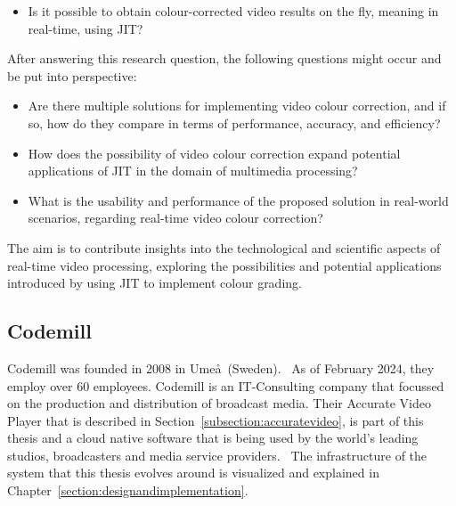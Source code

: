\documentclass[../MasterThesis.tex]{subfiles}
\begin{document}
	\begin{itemize}
		\item Is it possible to obtain colour-corrected video results on the fly, meaning in real-time, using JIT?
	\end{itemize}
	
	After answering this research question, the following questions might occur and be put into perspective:
	
	\begin{itemize}
		\item Are there multiple solutions for implementing video colour correction, and if so, how do they compare in terms of performance, accuracy, and efficiency?
		\item How does the possibility of video colour correction expand potential applications of JIT in the domain of multimedia processing?
		\item What is the usability and performance of the proposed solution in real-world scenarios, regarding real-time video colour correction?
	\end{itemize}
	
	The aim is to contribute insights into the technological and scientific aspects of real-time video processing, exploring the possibilities and potential applications introduced by using JIT to implement colour grading. 
	
	
	
	
	
	
	
	\subsection{Codemill} \label{subsection:codemill}
	
	Codemill was founded in 2008 in Ume\aa \ (Sweden).~\cite{codemill_now, codemill_old, codemill_linkedin}
	As of February 2024, they employ over 60 employees. \cite{codemill} 
	Codemill is an IT-Consulting company that focussed on the production and distribution of broadcast media. Their Accurate Video Player that is described in Section~\ref{subsection:accuratevideo}, is part of this thesis and a cloud native software that is being used by the world's leading studios, broadcasters and media service providers.~\cite{codemill_linkedin, codemill_avp}
	The infrastructure of the system that this thesis evolves around is visualized and explained in Chapter~\ref{section:designandimplementation}.
	
\end{document}
